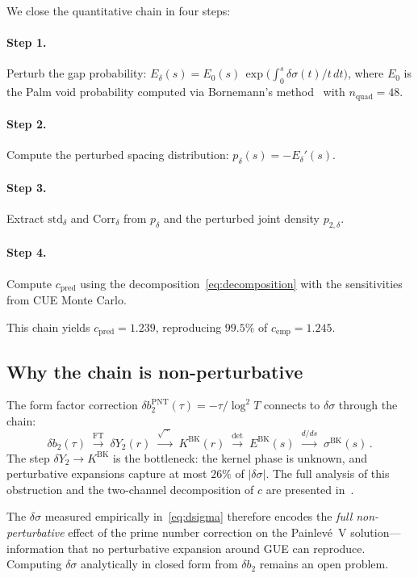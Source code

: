 \documentclass[11pt]{article}
\theoremstyle{plain}
\theoremstyle{remark}
\begin{document}
We close the quantitative chain in four steps:

\paragraph{Step 1.}
Perturb the gap probability:
$E_\delta(s) = E_0(s)\,\exp\!\bigl(\int_0^s \delta\sigma(t)/t\,dt\bigr)$,
where $E_0$ is the Palm void probability computed via
Bornemann's method~\cite{bornemann2010} with $n_{\mathrm{quad}} = 48$.

\paragraph{Step 2.}
Compute the perturbed spacing distribution:
$p_\delta(s) = -E_\delta'(s)$.

\paragraph{Step 3.}
Extract $\mathrm{std}_\delta$ and $\mathrm{Corr}_\delta$ from $p_\delta$
and the perturbed joint density $p_{2,\delta}$.

\paragraph{Step 4.}
Compute $c_{\mathrm{pred}}$ using the decomposition~\eqref{eq:decomposition}
with the sensitivities from CUE Monte Carlo.

This chain yields $c_{\mathrm{pred}} = 1.239$, reproducing $99.5\%$ of
$c_{\mathrm{emp}} = 1.245$.

\subsection{Why the chain is non-perturbative}

The form factor correction $\delta b_2^{\mathrm{PNT}}(\tau) = -\tau/\log^2 T$
connects to $\delta\sigma$ through the chain:
\begin{equation}
\delta b_2(\tau) \;\xrightarrow{\mathrm{FT}}\;
\delta Y_2(r) \;\xrightarrow{\sqrt{\;\cdot\;}}\;
K^{\mathrm{BK}}(r) \;\xrightarrow{\det}\;
E^{\mathrm{BK}}(s) \;\xrightarrow{d/ds}\;
\sigma^{\mathrm{BK}}(s)\,.
\label{eq:chain}
\end{equation}
The step $\delta Y_2 \to K^{\mathrm{BK}}$ is the bottleneck:
the kernel phase is unknown, and perturbative expansions capture at most
$26\%$ of $|\delta\sigma|$. The full analysis of this obstruction and the
two-channel decomposition of $c$ are presented in~\cite{alarcon2026b}.

The $\delta\sigma$ measured empirically in~\eqref{eq:dsigma} therefore
encodes the \emph{full non-perturbative} effect of the prime number
correction on the Painlev\'e~V solution---information that no
perturbative expansion around GUE can reproduce. Computing $\delta\sigma$
analytically in closed form from $\delta b_2$ remains an open problem.
\end{document}
